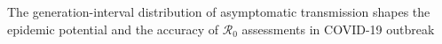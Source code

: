 The generation-interval distribution of asymptomatic transmission shapes the epidemic potential and the accuracy of $\mathcal R_0$ assessments in COVID-19 outbreak